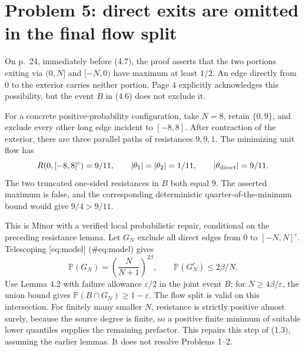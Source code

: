 \documentclass[10pt]{article}
\begin{document}
\section*{Problem 5: direct exits are omitted in the final flow split}
On p. 24, immediately before (4.7), the proof asserts that the two portions exiting via \((0,N]\) and \([-N,0)\) have maximum at least \(1/2\). An edge directly from 0 to the exterior carries neither portion. Page 4 explicitly acknowledges this possibility, but the event \(B\) in (4.6) does not exclude it.\par
For a concrete positive-probability configuration, take \(N=8\), retain \(\{0,9\}\), and exclude every other long edge incident to \([-8,8]\). After contraction of the exterior, there are three parallel paths of resistances \(9,9,1\). The minimizing unit flow has \[R(0,[-8,8]^c)=9/11,\qquad
 |\theta_1|=|\theta_2|=1/11,\qquad
 |\theta_{\rm direct}|=9/11.\] The two truncated one-sided resistances in \(B\) both equal 9. The asserted maximum is false, and the corresponding deterministic quarter-of-the-minimum bound would give \(9/4>9/11\).\par
This is Minor with a verified local probabilistic repair, conditional on the preceding resistance lemma. Let \(G_N\) exclude all direct edges from 0 to \([-N,N]^c\). Telescoping [eq:model] (\#eq:model) gives \[\mathbb P(G_N)=\left(\frac{N}{N+1}\right)^{2\beta},\qquad
 \mathbb P(G_N^c)\le 2\beta/N .\] Use Lemma 4.2 with failure allowance \(\varepsilon/2\) in the joint event \(B\); for \(N\ge4\beta/\varepsilon\), the union bound gives \(\mathbb P(B\cap G_N)\ge1-\varepsilon\). The flow split is valid on this intersection. For finitely many smaller \(N\), resistance is strictly positive almost surely, because the source degree is finite, so a positive finite minimum of suitable lower quantiles supplies the remaining prefactor. This repairs this step of (1.3), assuming the earlier lemmas. It does not resolve Problems 1–2.\par
\end{document}
